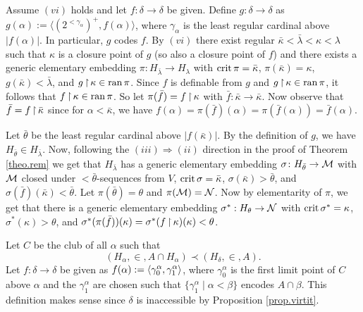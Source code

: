 \documentclass[../../main]{subfiles}
\begin{document}
{  \qquad {} Assume $(vi)$ holds and let $f\colon\delta\to\delta$ be given. Define $g\colon\delta\to\delta$ as $g(\alpha):=\langle(2^{<\gamma_\alpha})^+,f(\alpha)\rangle$, where $\gamma_\alpha$ is the least regular cardinal above $|f(\alpha)|$. In particular, $g$ codes $f$. By $(vi)$ there exist regular $\bar\kappa<\bar\lambda<\kappa<\lambda$ such that $\kappa$ is a closure point of $g$ (so also a closure point of $f$) and there exists a generic elementary embedding $\pi\colon H_{\bar\lambda}\to H_\lambda$ with $\operatorname{crit}\pi = \bar\kappa$, $\pi(\bar\kappa)=\kappa$, $g(\bar\kappa)<\bar\lambda$, and $g\operatorname{\upharpoonright}\kappa\in\operatorname{ran}\pi$. Since $f$ is definable from $g$ and $g\operatorname{\upharpoonright}\kappa\in\operatorname{ran}\pi$, it follows that $f\operatorname{\upharpoonright}\kappa\in\operatorname{ran} \pi$. So let $\pi(\bar f)=f\operatorname{\upharpoonright}\kappa$ with $\bar f\colon\bar\kappa\to\bar\kappa$. Now observe that $\bar f=f\operatorname{\upharpoonright}\bar\kappa$ since for $\alpha<\bar\kappa$, we have $f(\alpha)=\pi(\bar f)(\alpha)=\pi(\bar f(\alpha))=\bar f(\alpha)$.

  \qquad Let $\bar\theta$ be the least regular cardinal above $|f(\bar\kappa)|$. By the definition of $g$, we have $H_{\bar\theta}\in H_{\bar\lambda}$. Now, following the $(iii)\Rightarrow(ii)$ direction in the proof of Theorem \ref{theo.rem} we get that $H_{\bar\lambda}$ has a generic elementary embedding \hbox{$\sigma\colon H_{\bar\theta}\to\operatorname{\mathcal M}$} with $\operatorname{\mathcal M}$ closed under ${<}\bar\theta$-sequences from $V$, $\operatorname{crit}\sigma=\bar\kappa$, $\sigma(\bar\kappa)> \bar\theta$, and $\sigma(\bar f)(\bar\kappa)<\bar\theta$. Let $\pi(\bar\theta)=\theta$ and $\pi(\operatorname{\mathcal M})=\operatorname{\mathcal N}$. Now by elementarity of $\pi$, we get that there is a generic elementary embedding \hbox{$\sigma^*:H_\theta\to \operatorname{\mathcal N}$} with $\operatorname{crit}\sigma^*=\kappa$, $\sigma^*(\kappa)>\theta$, and $\sigma^*(\pi(\bar f))(\kappa)=\sigma^*(f\operatorname{\upharpoonright}\kappa)(\kappa)<\theta$.

  \qquad {} Let $C$ be the club of all $\alpha$ such that $$(H_\alpha,\in, A\cap H_\alpha)\prec(H_\delta,\in,A).$$ Let $f\colon\delta\to\delta$ be given as $f(\alpha):=\langle \gamma_0^\alpha,\gamma_1^\alpha\rangle$, where $\gamma_0^\alpha$ is the first limit point of $C$ above $\alpha$ and the $\gamma_1^\alpha$ are chosen such that $\{\gamma_1^\alpha\mid\alpha<\beta\}$ encodes $A\cap\beta$. This definition makes sense since $\delta$ is inaccessible by Proposition \ref{prop.virtit}.

}
\end{document}
